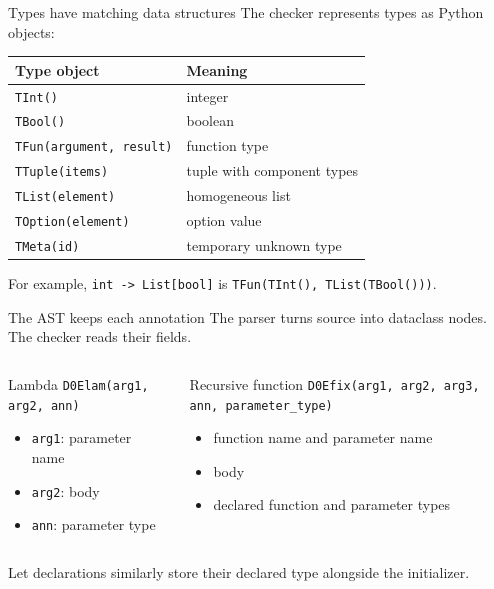 \documentclass[aspectratio=169,11pt]{beamer}
\begin{document}
\begin{frame}{Types have matching data structures}
The checker represents types as Python objects:
\begin{center}
\begin{tabular}{ll}
\textbf{Type object} & \textbf{Meaning} \\
\hline
\texttt{TInt()} & integer \\
\texttt{TBool()} & boolean \\
\texttt{TFun(argument, result)} & function type \\
\texttt{TTuple(items)} & tuple with component types \\
\texttt{TList(element)} & homogeneous list \\
\texttt{TOption(element)} & option value \\
\texttt{TMeta(id)} & temporary unknown type \\
\end{tabular}
\end{center}
\medskip
For example, \texttt{int -> List[bool]} is \texttt{TFun(TInt(), TList(TBool()))}.
\end{frame}

\begin{frame}{The AST keeps each annotation}
The parser turns source into dataclass nodes. The checker reads their fields.
\begin{columns}[T]
\begin{block}{Lambda}
\texttt{D0Elam(arg1, arg2, ann)}
\begin{itemize}
  \item \texttt{arg1}: parameter name
  \item \texttt{arg2}: body
  \item \texttt{ann}: parameter type
\end{itemize}
\end{block}
\begin{block}{Recursive function}
\texttt{D0Efix(arg1, arg2, arg3, ann, parameter\_type)}
\begin{itemize}
  \item function name and parameter name
  \item body
  \item declared function and parameter types
\end{itemize}
\end{block}
\end{columns}
Let declarations similarly store their declared type alongside the initializer.
\end{frame}
\end{document}
